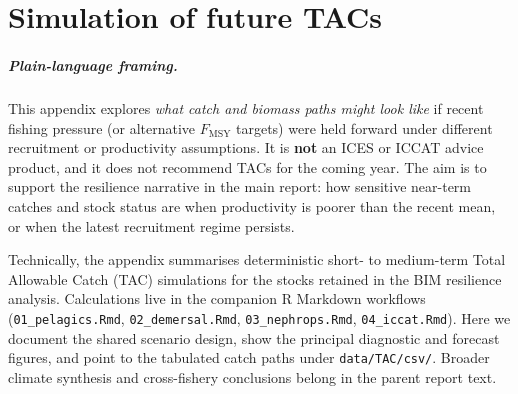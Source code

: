 %

\chapter{Simulation of future TACs}
\label{ch:tac-sim}

\paragraph{Plain-language framing.}
This appendix explores \emph{what catch and biomass paths might look like}
if recent fishing pressure (or alternative $F_{\mathrm{MSY}}$ targets) were
held forward under different recruitment or productivity assumptions. It is
\textbf{not} an ICES or ICCAT advice product, and it does not recommend TACs
for the coming year. The aim is to support the resilience narrative in the
main report: how sensitive near-term catches and stock status are when
productivity is poorer than the recent mean, or when the latest recruitment
regime persists.

Technically, the appendix summarises deterministic short- to medium-term Total
Allowable Catch (TAC) simulations for the stocks retained in the BIM
resilience analysis. Calculations live in the companion R Markdown workflows
(\texttt{01\_pelagics.Rmd}, \texttt{02\_demersal.Rmd}, \texttt{03\_nephrops.Rmd},
\texttt{04\_iccat.Rmd}). Here we document the shared scenario design, show the
principal diagnostic and forecast figures, and point to the tabulated catch
paths under \texttt{data/TAC/csv/}. Broader climate synthesis and
cross-fishery conclusions belong in the parent report text.


